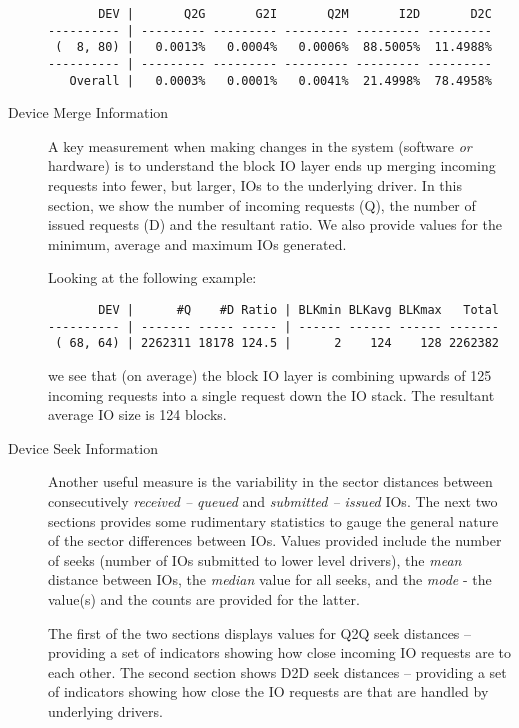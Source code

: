 \documentclass{article}
\begin{document}
\begin{description}
\begin{verbatim}
       DEV |       Q2G       G2I       Q2M       I2D       D2C
---------- | --------- --------- --------- --------- ---------
 (  8, 80) |   0.0013%   0.0004%   0.0006%  88.5005%  11.4988%
---------- | --------- --------- --------- --------- ---------
   Overall |   0.0003%   0.0001%   0.0041%  21.4998%  78.4958%
\end{verbatim}

  \item[Device Merge Information]

  A key measurement when making changes in the system (software \emph{or}
  hardware) is to understand the block IO layer ends up merging incoming
  requests into fewer, but larger, IOs to the underlying driver. In this
  section, we show the number of incoming requests (Q), the number of
  issued requests (D) and the resultant ratio. We also provide values
  for the minimum, average and maximum IOs generated.

  Looking at the following example:

\begin{verbatim}
       DEV |      #Q    #D Ratio | BLKmin BLKavg BLKmax   Total
---------- | ------- ----- ----- | ------ ------ ------ -------
 ( 68, 64) | 2262311 18178 124.5 |      2    124    128 2262382
\end{verbatim}

  we see that (on average) the block IO layer is combining upwards of
  125 incoming requests into a single request down the IO stack. The
  resultant average IO size is 124 blocks.

  \item[Device Seek Information]

  Another useful measure is the variability in the sector distances
  between consecutively \emph{received -- queued} and \emph{submitted
  -- issued} IOs. The next two sections provides some rudimentary
  statistics to gauge the general nature of the sector differences
  between IOs. Values provided include the number of seeks (number of IOs
  submitted to lower level drivers), the \emph{mean} distance between
  IOs, the \emph{median} value for all seeks, and the \emph{mode} -
  the value(s) and the counts are provided for the latter.

  The first of the two sections displays values for Q2Q seek distances --
  providing a set of indicators showing how close incoming IO requests
  are to each other. The second section shows D2D seek distances --
  providing a set of indicators showing how close the IO requests are
  that are handled by underlying drivers.


\end{description}
\end{document}
